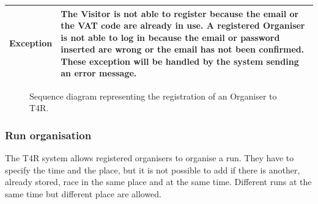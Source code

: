 \begin{table}[H]
\begin{tabular}{|p{3cm}|p{8.2cm}|}
                     \hline
                    \textbf{Exception} & The Visitor is not able to register because the email or the VAT code                      are already in use. \newline
                                         A registered Organiser is not able to log in because the email or password inserted are wrong or the email has not been confirmed. \newline
                                         These exception will be handled by the system sending an error message. \\
                                         \hline
                \end{tabular}  
            \end{table}
            
            \begin{figure}[H]
                \centering
                \caption{Sequence diagram representing the registration of an Organiser to T4R.}
                \label{fig:Organiser-registration-sequence-diagram}
            \end{figure}
            
        \subsubsection{Run organisation}
            
            The T4R system allows registered organisers to organise a run. They have to specify the time and the place, but it is not possible to add if there is another, already stored, race in the same place and at the same time. Different runs at the same time but different place are allowed.
            
